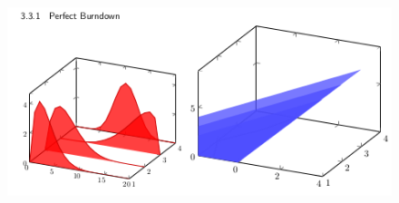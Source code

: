 \documentclass[twocolumn,landscape,8pt]{article}
\begin{document}

\begin{figure}[t]
{\footnotesize

}
\end{figure}

%

%

\begin{figure}[t]
  \centering\includegraphics[width=\columnwidth,height=0.1\textheight]{burndown}
%
\end{figure}


%


\end{document}
